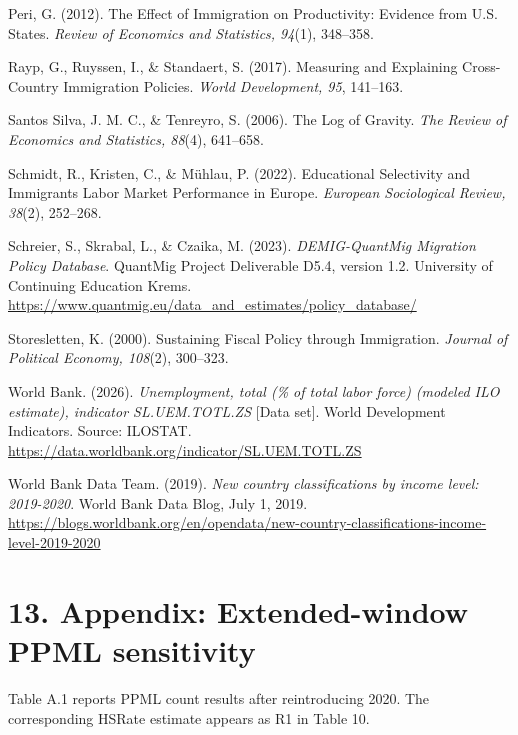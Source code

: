 \documentclass[11pt,a4paper]{article}
\newenvironment{hangrefs}{%
  \par\begingroup\setlength{\leftskip}{1.5em}\setlength{\parindent}{-1.5em}%
}{\par\endgroup}
\begin{document}
\begin{hangrefs}
Peri, G. (2012). The Effect of Immigration on Productivity: Evidence
from U.S. States. \emph{Review of Economics and Statistics, 94}(1),
348--358.

Rayp, G., Ruyssen, I., \& Standaert, S. (2017). Measuring and Explaining
Cross-Country Immigration Policies. \emph{World Development, 95},
141--163.

Santos Silva, J. M. C., \& Tenreyro, S. (2006). The Log of Gravity.
\emph{The Review of Economics and Statistics, 88}(4), 641--658.

Schmidt, R., Kristen, C., \& Mühlau, P. (2022). Educational Selectivity
and Immigrants\textquotesingle{} Labor Market Performance in Europe.
\emph{European Sociological Review, 38}(2), 252--268.

Schreier, S., Skrabal, L., \& Czaika, M. (2023). \emph{DEMIG-QuantMig
Migration Policy Database}. QuantMig Project Deliverable D5.4, version
1.2. University of Continuing Education Krems.
\url{https://www.quantmig.eu/data_and_estimates/policy_database/}

Storesletten, K. (2000). Sustaining Fiscal Policy through Immigration.
\emph{Journal of Political Economy, 108}(2), 300--323.

World Bank. (2026). \emph{Unemployment, total (\% of total labor force)
(modeled ILO estimate), indicator SL.UEM.TOTL.ZS} {[}Data set{]}. World
Development Indicators. Source: ILOSTAT.
\url{https://data.worldbank.org/indicator/SL.UEM.TOTL.ZS}

World Bank Data Team. (2019). \emph{New country classifications by
income level: 2019-2020}. World Bank Data Blog, July 1, 2019.
\url{https://blogs.worldbank.org/en/opendata/new-country-classifications-income-level-2019-2020}
\end{hangrefs}

\clearpage
\section{13. Appendix: Extended-window PPML
sensitivity}\label{appendix-extended-window-ppml-sensitivity}

Table A.1 reports PPML count results after reintroducing 2020. The
corresponding HSRate estimate appears as R1 in Table 10.
\end{document}
